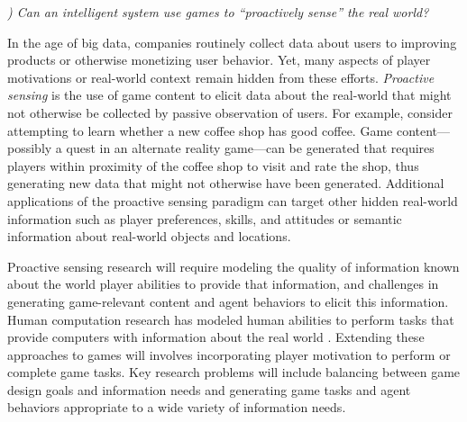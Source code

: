 \documentclass[conference]{IEEEtran}
\newcounter{questionno}
\newcommand{\subsubsectionx}[1]{{\em {\arabic{questionno}) #1}}
	\addtocounter{questionno}{1}
	}
\begin{document}


\subsubsectionx{Can an intelligent system use games to ``proactively sense'' the real world?}
%
In the age of big data, companies routinely collect data about users to improving products or otherwise monetizing user behavior.
Yet, many aspects of player motivations or real-world context remain hidden from these efforts.
{\em Proactive sensing} is the use of game content to elicit data about the real-world that might not otherwise be collected by passive observation of users.
%
For example, consider attempting to learn whether a new coffee shop has good coffee.
Game content---possibly a quest in an alternate reality game---can be generated that requires players within proximity of the coffee shop to visit and rate the shop, thus generating new data that might not otherwise have been generated.
Additional applications of the proactive sensing paradigm can target other hidden real-world information such as player preferences, skills, and attitudes or semantic information about real-world objects and locations.

Proactive sensing research will require modeling the quality of information known about the world player abilities to provide that information, and challenges in generating game-relevant content and agent behaviors to elicit this information. 
Human computation research has modeled human abilities to perform tasks that provide computers with information about the real world \cite{law2011:hcomp-book}. 
Extending these approaches to games will involves incorporating player motivation to perform or complete game tasks.
Key research problems will include balancing between game design goals and information needs and generating game tasks and agent behaviors appropriate to a wide variety of information needs.
\end{document}
